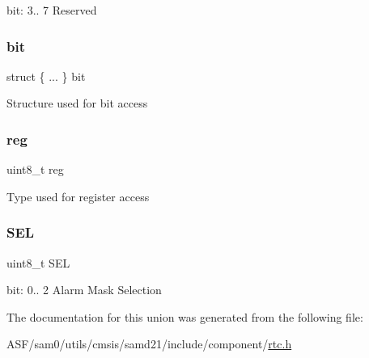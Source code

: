 bit\+: 3.. 7 Reserved \mbox{\label{union_r_t_c___m_o_d_e2___m_a_s_k___type_a6d425ee8382b570ba8d344ac760e48c5}} 
\subsubsection{\texorpdfstring{bit}{bit}}
{\footnotesize\ttfamily struct \{ ... \}   bit}

Structure used for bit access \mbox{\label{union_r_t_c___m_o_d_e2___m_a_s_k___type_a9428adc9af4653a2050e2536b55dec8d}} 
\subsubsection{\texorpdfstring{reg}{reg}}
{\footnotesize\ttfamily uint8\+\_\+t reg}

Type used for register access \mbox{\label{union_r_t_c___m_o_d_e2___m_a_s_k___type_a858f4a0aa39020bb681254ec2371a3d6}} 
\subsubsection{\texorpdfstring{SEL}{SEL}}
{\footnotesize\ttfamily uint8\+\_\+t S\+EL}

bit\+: 0.. 2 Alarm Mask Selection 

The documentation for this union was generated from the following file\+:\begin{DoxyCompactItemize}
\item 
A\+S\+F/sam0/utils/cmsis/samd21/include/component/\mbox{\hyperlink{component_2rtc_8h}{rtc.\+h}}\end{DoxyCompactItemize}
